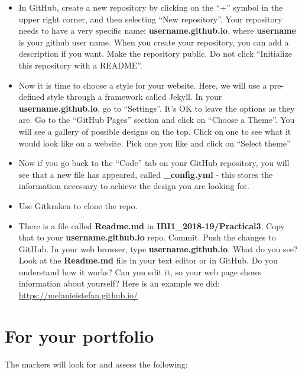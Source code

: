 \documentclass[pdflatex,a4paper]{article}
\begin{document}
\begin{itemize}
\item
  In GitHub, create a new repository by clicking on the ``+'' symbol in the upper right corner, and then selecting ``New repository''. Your repository needs to have a very specific name: \textbf{\<username\>.github.io}, where \textbf{\<username\>} is your github user name. When you create your repository, you can add a description if you want. Make the repository public. Do not click ``Initialize this repository with a README''.
\item
Now it is time to choose a style for your website. Here, we will use a pre-defined style through a framework called Jekyll. In your \textbf{\<username\>.github.io}, go to ``Settings''.  It's OK to leave the options as they are. Go to the ``GitHub Pages'' section and click on ``Choose a Theme''. You will see a gallery of possible designs on the top. Click on one to see what it would look like on a website. Pick one you like and click on ``Select theme''
\item
Now if you go back to the ``Code'' tab on your GitHub repository, you will see that a new file has appeared, called \textbf{\_config.yml} - this stores the information necessary to achieve the design you are looking for. 
\item
Use Gitkraken to clone the repo.
\item
  There is a file called \textbf{Readme.md} in \textbf{IBI1\_2018-19/Practical3}. Copy that to your \textbf{\<username\>.github.io} repo. Commit. Push the changes to GitHub. In your web browser, type \textbf{\<username\>.github.io}. What do you see? Look at the \textbf{Readme.md} file in your text editor or in GitHub. Do you understand how it works? Can you edit it, so your web page shows information about yourself? Here is an example we did: \url{https://melanieistefan.github.io/}
\end{itemize}


\section{For your portfolio}

The markers will look for and assess the following:
\end{document}
